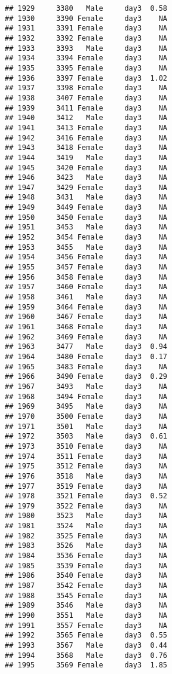 \documentclass[
]{article}
\begin{document}
\begin{verbatim}
## 1929     3380   Male     day3  0.58
## 1930     3390 Female     day3    NA
## 1931     3391 Female     day3    NA
## 1932     3392 Female     day3    NA
## 1933     3393   Male     day3    NA
## 1934     3394 Female     day3    NA
## 1935     3395 Female     day3    NA
## 1936     3397 Female     day3  1.02
## 1937     3398 Female     day3    NA
## 1938     3407 Female     day3    NA
## 1939     3411 Female     day3    NA
## 1940     3412   Male     day3    NA
## 1941     3413 Female     day3    NA
## 1942     3416 Female     day3    NA
## 1943     3418 Female     day3    NA
## 1944     3419   Male     day3    NA
## 1945     3420 Female     day3    NA
## 1946     3423   Male     day3    NA
## 1947     3429 Female     day3    NA
## 1948     3431   Male     day3    NA
## 1949     3449 Female     day3    NA
## 1950     3450 Female     day3    NA
## 1951     3453   Male     day3    NA
## 1952     3454 Female     day3    NA
## 1953     3455   Male     day3    NA
## 1954     3456 Female     day3    NA
## 1955     3457 Female     day3    NA
## 1956     3458 Female     day3    NA
## 1957     3460 Female     day3    NA
## 1958     3461   Male     day3    NA
## 1959     3464 Female     day3    NA
## 1960     3467 Female     day3    NA
## 1961     3468 Female     day3    NA
## 1962     3469 Female     day3    NA
## 1963     3477   Male     day3  0.94
## 1964     3480 Female     day3  0.17
## 1965     3483 Female     day3    NA
## 1966     3490 Female     day3  0.29
## 1967     3493   Male     day3    NA
## 1968     3494 Female     day3    NA
## 1969     3495   Male     day3    NA
## 1970     3500 Female     day3    NA
## 1971     3501   Male     day3    NA
## 1972     3503   Male     day3  0.61
## 1973     3510 Female     day3    NA
## 1974     3511 Female     day3    NA
## 1975     3512 Female     day3    NA
## 1976     3518   Male     day3    NA
## 1977     3519 Female     day3    NA
## 1978     3521 Female     day3  0.52
## 1979     3522 Female     day3    NA
## 1980     3523   Male     day3    NA
## 1981     3524   Male     day3    NA
## 1982     3525 Female     day3    NA
## 1983     3526   Male     day3    NA
## 1984     3536 Female     day3    NA
## 1985     3539 Female     day3    NA
## 1986     3540 Female     day3    NA
## 1987     3542 Female     day3    NA
## 1988     3545 Female     day3    NA
## 1989     3546   Male     day3    NA
## 1990     3551   Male     day3    NA
## 1991     3557 Female     day3    NA
## 1992     3565 Female     day3  0.55
## 1993     3567   Male     day3  0.44
## 1994     3568   Male     day3  0.76
## 1995     3569 Female     day3  1.85

\end{verbatim}
\end{document}
